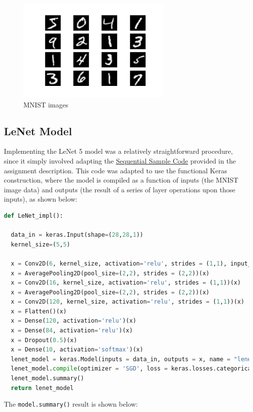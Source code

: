 \documentclass{article}
\begin{document}
\begin{figure}[H]
    \centering
    \includegraphics[width=3in]{csci-8920/hw-2/images/mnist.png}
    \caption{MNIST images}
    \label{fig:mnist}
\end{figure}

\subsection{LeNet Model}
Implementing the LeNet 5 model was a relatively straightforward procedure, since it simply involved adapting the \href{https://github.com/TaavishThaman/LeNet-5-with-Keras/blob/master/lenet_5.py}{Sequential Sample Code} provided in the assignment description.
This code was adapted to use the functional Keras construction, where the model is compiled as a function of inputs (the MNIST image data) and outputs (the result of a series of layer operations upon those inputs), as shown below:
\begin{lstlisting}[language=Python]
def LeNet_impl():

  data_in = keras.Input(shape=(28,28,1))
  kernel_size=(5,5)

  x = Conv2D(6, kernel_size, activation='relu', strides = (1,1), input_shape= (28,28,1), padding='same')(data_in)
  x = AveragePooling2D(pool_size=(2,2), strides = (2,2))(x)
  x = Conv2D(16, kernel_size, activation='relu', strides = (1,1))(x)
  x = AveragePooling2D(pool_size=(2,2), strides = (2,2))(x)
  x = Conv2D(120, kernel_size, activation='relu', strides = (1,1))(x)
  x = Flatten()(x)
  x = Dense(120, activation='relu')(x)
  x = Dense(84, activation='relu')(x)
  x = Dropout(0.5)(x)
  x = Dense(10, activation='softmax')(x)
  lenet_model = keras.Model(inputs = data_in, outputs = x, name = "lenet_model")
  lenet_model.compile(optimizer = 'SGD', loss = keras.losses.categorical_crossentropy, metrics = ['accuracy'])
  lenet_model.summary()
  return lenet_model
\end{lstlisting}

The \lstinline{model.summary()} result is shown below:
\end{document}
